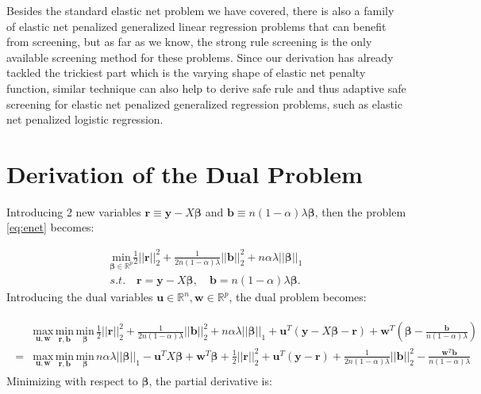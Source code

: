 Besides the standard elastic net problem we have covered, there is also a family of elastic net penalized generalized linear regression problems that can benefit from screening, but as far as we know, the strong rule screening is the only available screening method for these problems. Since our derivation has already tackled the trickiest part which is the varying shape of elastic net penalty function, similar technique can also help to derive safe rule and thus adaptive safe screening for elastic net penalized generalized regression problems, such as elastic net penalized logistic regression.

\appendix
\appendixpage

\section{Derivation of the Dual Problem}
\label{sec:dual}

Introducing 2 new variables $\boldsymbol r\equiv \boldsymbol y-X\boldsymbol\beta$ and $\boldsymbol b\equiv n(1-\alpha)\lambda \boldsymbol\beta$, then the problem \eqref{eq:enet} becomes:

\begin{equation}
    \label{eq:dual+rb}
    \begin{gathered}
    \underset{\boldsymbol\beta\in \mathbb{R}^p}{\mathrm{min}}\frac{1}{2}||\boldsymbol r||_2^2+\frac{1}{2n(1-\alpha)\lambda}||\boldsymbol b||_2^2+n\alpha\lambda||\boldsymbol\beta||_1\\s.t.\quad \boldsymbol r=\boldsymbol y-X\boldsymbol\beta,\quad \boldsymbol b=n(1-\alpha)\lambda \boldsymbol\beta.
\end{gathered}
\end{equation}
Introducing the dual variables $\boldsymbol u\in\mathbb{R}^{n},\boldsymbol w\in\mathbb{R}^p$, the dual problem becomes:

\begin{gather}
    \label{eq:dual+uw}
    \begin{aligned}
        &\underset{\boldsymbol u,\boldsymbol w}{\mathrm{max}}\,\underset{\boldsymbol r,\boldsymbol b}{\mathrm{min}}\,\underset{\boldsymbol\beta}{\mathrm{min}}\,\frac{1}{2}||\boldsymbol r||_2^2+\frac{1}{2n(1-\alpha)\lambda}||\boldsymbol b||_2^2+n\alpha\lambda||\boldsymbol\beta||_1+\boldsymbol u^T(\boldsymbol y-X\boldsymbol\beta-\boldsymbol r)+\boldsymbol w^T\left(\boldsymbol\beta-\frac{\boldsymbol b}{n(1-\alpha)\lambda}\right)\\
        =&\underset{\boldsymbol u,\boldsymbol w}{\mathrm{max}}\,\underset{\boldsymbol r,\boldsymbol b}{\mathrm{min}}\,\underset{\boldsymbol\beta}{\mathrm{min}}\,n\alpha\lambda||\boldsymbol\beta||_1-\boldsymbol u^TX\boldsymbol\beta+\boldsymbol w^T\boldsymbol\beta+\frac{1}{2}||\boldsymbol r||_2^2+\boldsymbol u^T(\boldsymbol y-\boldsymbol r)+\frac{1}{2n(1-\alpha)\lambda}||\boldsymbol b||_2^2-\frac{\boldsymbol w^T\boldsymbol b}{n(1-\alpha)\lambda}
    \end{aligned}    
\end{gather}
Minimizing with respect to $\boldsymbol\beta$, the partial derivative is:

